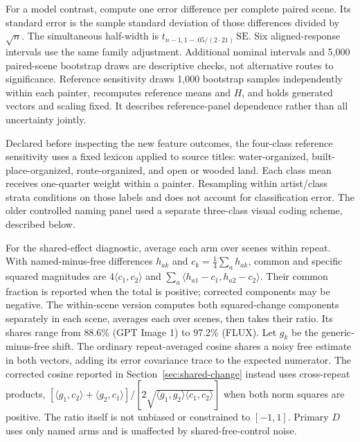 \documentclass[11pt]{article}
\begin{document}
For a model contrast, compute one error difference per complete paired scene.
Its standard error is the sample standard deviation of those differences divided
by $\sqrt n$. The simultaneous half-width is
$t_{n-1,1-.05/(2\cdot21)}\,\mathrm{SE}$. Six aligned-response intervals use the same
family adjustment. Additional nominal intervals and 5,000 paired-scene bootstrap
draws are descriptive checks, not alternative routes to significance. Reference
sensitivity draws 1,000 bootstrap samples independently within each painter,
recomputes reference means and $H$, and holds generated vectors and scaling
fixed. It describes reference-panel dependence rather than all uncertainty
jointly.

Declared before inspecting the new feature outcomes, the four-class reference
sensitivity uses a fixed lexicon applied to source titles: water-organized, built-place-organized, route-organized, and open or
wooded land. Each class mean receives one-quarter weight within a painter.
Resampling within artist/class strata conditions on those labels and does not
account for classification error. The older controlled naming panel used a
separate three-class visual coding scheme, described below.

For the shared-effect diagnostic, average each arm over scenes within repeat.
With named-minus-free differences $h_{ak}$ and $c_k=\frac14\sum_a h_{ak}$,
common and specific squared magnitudes are $4\langle c_1,c_2\rangle$ and
$\sum_a\langle h_{a1}-c_1,h_{a2}-c_2\rangle$. Their common fraction is reported
when the total is positive; corrected components may be negative. The within-scene
version computes both squared-change components separately in each scene,
averages each over scenes, then takes their ratio. Its shares range from 88.6\%
(GPT Image 1) to 97.2\% (FLUX).
Let $g_k$ be the generic-minus-free shift. The ordinary repeat-averaged cosine
shares a noisy free estimate in both vectors, adding its error covariance trace
to the expected numerator. The corrected cosine reported in
Section~\ref{sec:shared-change} instead uses cross-repeat products,
$[\langle g_1,c_2\rangle+\langle g_2,c_1\rangle]/
[2\sqrt{\langle g_1,g_2\rangle\langle c_1,c_2\rangle}]$ when both norm squares
are positive. The ratio itself is not unbiased or constrained to $[-1,1]$.
Primary $D$ uses only named arms and is unaffected by shared-free-control noise.




\end{document}
